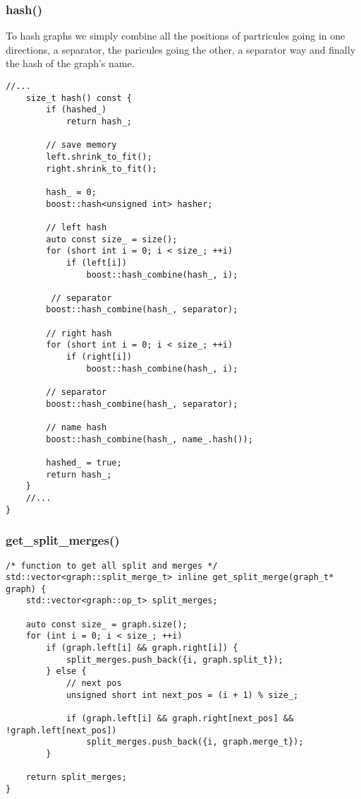 \documentclass[11pt]{article}
\begin{document}
\subsubsection{hash()}

To hash graphs we simply combine all the positions of partricules going in one directions, a separator, the paricules going the other, a separator way and finally the hash of the graph's name.

\begin{lstlisting}[style=CStyle]
	//...
	size_t hash() const {
		if (hashed_)
			return hash_;

		// save memory 
		left.shrink_to_fit();
		right.shrink_to_fit();

		hash_ = 0;
		boost::hash<unsigned int> hasher;

		// left hash 
		auto const size_ = size();
		for (short int i = 0; i < size_; ++i)
			if (left[i])
				boost::hash_combine(hash_, i);

	 	 // separator 
	  	boost::hash_combine(hash_, separator);

	  	// right hash 
	  	for (short int i = 0; i < size_; ++i)
			if (right[i])
				boost::hash_combine(hash_, i);

	  	// separator 
	  	boost::hash_combine(hash_, separator);

	  	// name hash 
	  	boost::hash_combine(hash_, name_.hash());
			
	  	hashed_ = true;
	  	return hash_;
	}
	//...
}
\end{lstlisting}

\subsubsection{get\_split\_merges()}

\begin{lstlisting}[style=CStyle]
/* function to get all split and merges */
std::vector<graph::split_merge_t> inline get_split_merge(graph_t* graph) {
	std::vector<graph::op_t> split_merges;
	
	auto const size_ = graph.size();
	for (int i = 0; i < size_; ++i)
		if (graph.left[i] && graph.right[i]) {
			split_merges.push_back({i, graph.split_t});
		} else {
			// next pos
			unsigned short int next_pos = (i + 1) % size_; 

			if (graph.left[i] && graph.right[next_pos] && !graph.left[next_pos])
				split_merges.push_back({i, graph.merge_t});
		}

	return split_merges;
}
\end{lstlisting}
\end{document}
